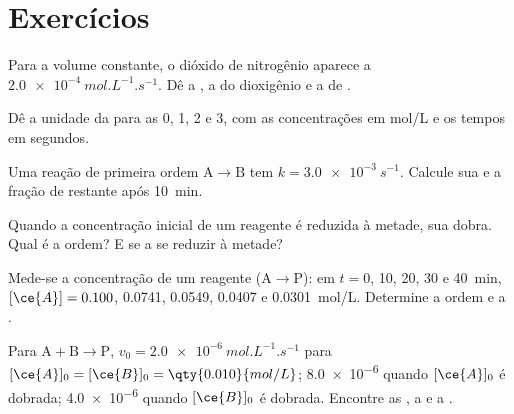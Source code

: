 \section{Exercícios}

\begin{exercise}[$\star$]\label{exo:b1:rate-laws:1}
Para  a volume constante, o dióxido de nitrogênio
aparece a $\qty{2.0e-4}{mol.L^{-1}.s^{-1}}$. Dê a ,
a  do dioxigênio e a 
de .
\end{exercise}

\begin{exercise}[$\star$]\label{exo:b1:rate-laws:2}
Dê a unidade da  para as  0, 1, 2 e
3, com as concentrações em \unit{mol/L} e os tempos em segundos.
\end{exercise}

\begin{exercise}[$\star$]\label{exo:b1:rate-laws:3}
Uma reação de primeira ordem $\mathrm{A} \longrightarrow \mathrm{B}$ tem $k = \qty{3.0e-3}{s^{-1}}$.
Calcule sua  e a fração de  restante após \qty{10}{min}.
\end{exercise}

\begin{exercise}[$\star$]\label{exo:b1:rate-laws:4}
Quando a concentração inicial de um reagente é reduzida à metade, sua
 dobra. Qual é a ordem? E se a  se reduzir à metade?
\end{exercise}

\begin{exercise}[$\star\star$]\label{exo:b1:rate-laws:5}
Mede-se a concentração de um reagente  ($\mathrm{A} \longrightarrow \mathrm{P}$): em $t
= 0$, 10, 20, 30 e \qty{40}{min}, $[\ce{A}] = 0.100$, 0.0741, 0.0549,
0.0407 e \qty{0.0301}{mol/L}. Determine a ordem e a .
\end{exercise}

\begin{exercise}[$\star\star$]\label{exo:b1:rate-laws:6}
Para $\mathrm{A} + \mathrm{B} \longrightarrow \mathrm{P}$, $v_0 = \qty{2.0e-6}{mol.L^{-1}.s^{-1}}$ para $[\ce{A}]_0
= [\ce{B}]_0 = \qty{0.010}{mol/L}$; \qty{8.0e-6}{} quando $[\ce{A}]_0$ é
dobrada; \qty{4.0e-6}{} quando $[\ce{B}]_0$ é dobrada. Encontre as , a  e a .
\end{exercise}

